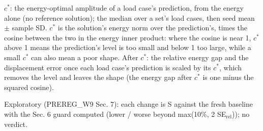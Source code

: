 \begin{table}[t]
\centering
\small
\caption{S against the fresh baseline with the energy-optimal amplitude $c^*$ on every evaluation set (exploratory).}
\label{tab:w9-s-amp}

\smallskip
\begin{minipage}{\linewidth}\footnotesize\raggedright
$c^*$: the energy-optimal amplitude of a load case's prediction, from the energy alone (no reference solution); the median over a set's load cases, then seed mean $\pm$ sample SD. $c^*$ is the solution's energy norm over the prediction's, times the cosine between the two in the energy inner product: where the cosine is near 1, $c^*$ above 1 means the prediction's level is too small and below 1 too large, while a small $c^*$ can also mean a poor shape. After $c^*$: the relative energy gap and the displacement error once each load case's prediction is scaled by its $c^*$, which removes the level and leaves the shape (the energy gap after $c^*$ is one minus the squared cosine).\par
Exploratory (PREREG\_W9 Sec. 7): each change is S against the fresh baseline with the Sec. 6 guard computed (lower / worse beyond max(10\%, 2 SE$_\mathrm{rel}$)); no verdict.
\end{minipage}
\end{table}
